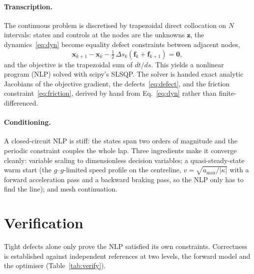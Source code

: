 \documentclass[11pt,a4paper]{article}
\begin{document}
\paragraph{Transcription.} The continuous problem is discretised by trapezoidal direct collocation
on $N$ intervals: states and controls at the nodes are the unknowns $\mathbf{z}$, the
dynamics~\eqref{eq:dyn} become equality defect constraints between adjacent nodes,
\begin{equation}
  \mathbf{x}_{k+1} - \mathbf{x}_k - \tfrac12\,\Delta s_k(\mathbf{f}_k + \mathbf{f}_{k+1}) = \mathbf{0},
  \label{eq:defect}
\end{equation}
and the objective is the trapezoidal sum of $dt/ds$. This yields a nonlinear program (NLP) solved
with scipy's SLSQP. The solver is handed exact analytic Jacobians of the objective gradient, the
defects~\eqref{eq:defect}, and the friction constraint~\eqref{eq:friction}, derived by hand from
Eq.~\eqref{eq:dyn} rather than finite-differenced.

\paragraph{Conditioning.} A closed-circuit NLP is stiff: the states span two orders of magnitude
and the periodic constraint couples the whole lap. Three ingredients make it converge cleanly:
variable scaling to dimensionless decision variables; a quasi-steady-state warm start (the
$g$--$g$-limited speed profile on the centreline, $v=\sqrt{a_\text{max}/|\kappa|}$ with a forward
acceleration pass and a backward braking pass, so the NLP only has to find the line); and mesh
continuation.

\section{Verification}
Tight defects alone only prove the NLP satisfied its own constraints. Correctness is established
against independent references at two levels, the forward model and the optimiser
(Table~\ref{tab:verify}).
\end{document}
